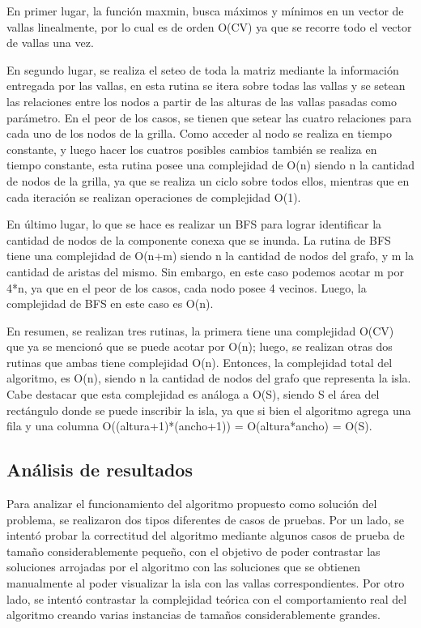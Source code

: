 \documentclass[a4paper, 12pt]{article}
\begin{document}
En primer lugar, la función maxmin, busca máximos y mínimos en un vector de vallas linealmente, por lo cual es de orden O(CV) ya que se recorre todo el vector de vallas una vez.

En segundo lugar, se realiza el seteo de toda la matriz mediante la información entregada por las vallas, en esta rutina se itera sobre todas las vallas y se setean las relaciones entre los nodos a partir de las alturas de las vallas pasadas como parámetro. En el peor de los casos, se tienen que setear las cuatro relaciones para cada uno de los nodos de la grilla. Como acceder al nodo se realiza en tiempo constante, y luego hacer los cuatros posibles cambios también se realiza en tiempo constante, esta rutina posee una complejidad de O(n) siendo n la cantidad de nodos de la grilla, ya que se realiza un ciclo sobre todos ellos, mientras que en cada iteración se realizan operaciones de complejidad O(1).

En último lugar, lo que se hace es realizar un BFS para lograr identificar la cantidad de nodos de la componente conexa que se inunda. La rutina de BFS tiene una complejidad de O(n+m) siendo n la cantidad de nodos del grafo, y m la cantidad de aristas del mismo. Sin embargo, en este caso podemos acotar m por 4*n, ya que en el peor de los casos, cada nodo posee 4 vecinos. Luego, la complejidad de BFS en este caso es O(n).

En resumen, se realizan tres rutinas, la primera tiene una complejidad O(CV) que ya se mencionó que se puede acotar por O(n); luego, se realizan otras dos rutinas que ambas tiene complejidad O(n). Entonces, la complejidad total del algoritmo, es O(n), siendo n la cantidad de nodos del grafo que representa la isla. Cabe destacar que esta complejidad es análoga a O(S), siendo S el área del rectángulo donde se puede inscribir la isla, ya que si bien el algoritmo agrega una fila y una columna O((altura+1)*(ancho+1)) = O(altura*ancho) = O(S).

\subsection*{Análisis de resultados}
Para analizar el funcionamiento del algoritmo propuesto como solución del problema, se realizaron dos tipos diferentes de casos de pruebas. Por un lado, se intentó probar la correctitud del algoritmo mediante algunos casos de prueba de tama\~{n}o considerablemente peque\~{n}o, con el objetivo de poder contrastar las soluciones arrojadas por el algoritmo con las soluciones que se obtienen manualmente al poder visualizar la isla con las vallas correspondientes. Por otro lado, se intentó contrastar la complejidad teórica con el comportamiento real del algoritmo creando varias instancias de tama\~{n}os considerablemente grandes.
\end{document}
